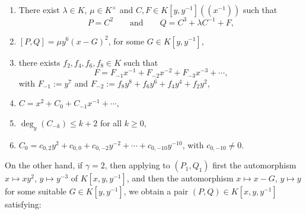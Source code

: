 \documentclass[reqno,a4paper]{amsart}
\theoremstyle{definition}
\theoremstyle{remark}
\begin{document}
\begin{enumerate}

\smallskip

\item[(a1)] There exist $\lambda\in K$, $\mu\in K^{\times}$ and $C,F\in K[y,y^{-1}]((x^{-1}))$ such that
$$
P=C^2\qquad\text{and}\qquad Q=C^3+\lambda C^{-1}+F,
$$

\smallskip

\item[(a2)] $[P,Q]=\mu  y^6 (x-G)^2$, for some $G\in K[y,y^{-1}]$,

\smallskip

\item[(a3)] there exists $f_2,f_4,f_6,f_8\in K$ such that
$$
F=F_{-1} x^{-1}+F_{-2} x^{-2}+F_{-3} x^{-3}+\cdots,
$$
with $F_{-1}:=y^7$ and $F_{-2} := f_8 y^8 + f_6 y^6 + f_4 y^4 + f_2 y^2$,

\smallskip

\item[(a4)] $C=x^2+C_0+C_{-1}x^{-1}+\cdots$,

\smallskip

\item[(a5)] $\deg_y(C_{-k})\le k+2$ for all $k\ge 0$,

\smallskip

\item[(a6)] $C_0=c_{0,2} y^2+c_{0,0}+c_{0,-2} y^{-2}+\cdots+ c_{0,-10} y^{-10}$, with $c_{0,-10}\ne 0$.

\smallskip

\end{enumerate}
On the other hand, if $\gamma=2$, then applying to $(P_1,Q_1)$ first the automorphism
$x \mapsto xy^2$, $y \mapsto y^{-3}$ of $K[x,y,y^{-1}]$, and then the automorphism
$x\mapsto x-G$, $y\mapsto y$ for some suitable $G\in K[y,y^{-1}]$, we obtain a pair
$(P,Q)\in K[x,y,y^{-1}]$ satisfying:
\end{document}
